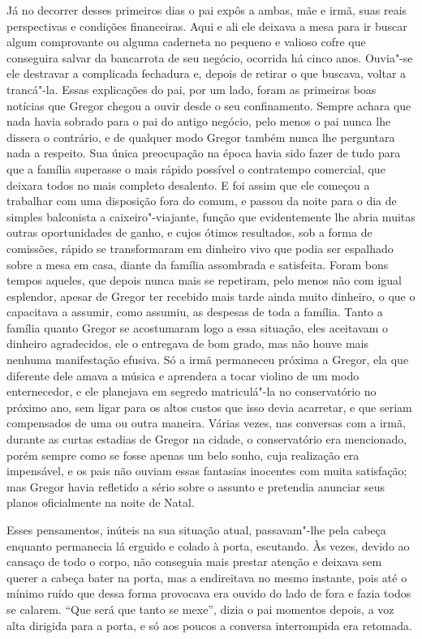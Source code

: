 Já no decorrer desses primeiros dias o pai expôs a ambas, mãe e irmã, suas
reais perspectivas e condições financeiras. Aqui e ali ele deixava a mesa
para ir buscar algum comprovante ou alguma caderneta no pequeno e valioso
cofre que conseguira salvar da bancarrota de seu negócio, ocorrida há
cinco anos. Ouvia"-se ele destravar a complicada fechadura e, depois de
retirar o que buscava, voltar a trancá"-la. Essas explicações do pai, por
um lado, foram as primeiras boas notícias que Gregor chegou a ouvir desde
o seu confinamento. Sempre achara que nada havia sobrado para o pai do
antigo negócio, pelo menos o pai nunca lhe dissera o contrário, e de
qualquer modo Gregor também nunca lhe perguntara nada a respeito. Sua
única preocupação na época havia sido fazer de tudo para que a família
superasse o mais rápido possível o contratempo comercial, que deixara
todos no mais completo desalento. E foi assim que ele começou a trabalhar
com uma disposição fora do comum, e passou da noite para o dia de simples
balconista a caixeiro"-viajante, função que evidentemente lhe abria muitas
outras oportunidades de ganho, e cujos ótimos resultados, sob a forma de
comissões, rápido se transformaram em dinheiro vivo que podia ser
espalhado sobre a mesa em casa, diante da família assombrada e satisfeita.
Foram bons tempos aqueles, que depois nunca mais se repetiram, pelo menos
não com igual esplendor, apesar de Gregor ter recebido mais tarde ainda
muito dinheiro, o que o capacitava a assumir, como assumiu, as despesas de
toda a família. Tanto a família quanto Gregor se acostumaram logo a essa
situação, eles aceitavam o dinheiro agradecidos, ele o entregava de bom
grado, mas não houve mais nenhuma manifestação efusiva. Só a irmã
permaneceu próxima a Gregor, ela que diferente dele amava a música e
aprendera a tocar violino de um modo enternecedor, e ele planejava em
segredo matriculá"-la no conservatório no próximo ano, sem ligar para os
altos custos que isso devia acarretar, e que seriam compensados de uma ou
outra maneira. Várias vezes, nas conversas com a irmã, durante as curtas
estadias de Gregor na cidade, o conservatório era mencionado, porém sempre
como se fosse apenas um belo sonho, cuja realização era impensável, e os
pais não ouviam essas fantasias inocentes com muita satisfação; mas Gregor
havia refletido a sério sobre o assunto e pretendia anunciar seus planos
oficialmente na noite de Natal.

Esses pensamentos, inúteis na sua situação atual, passavam"-lhe pela cabeça
enquanto permanecia lá erguido e colado à porta, escutando. Às vezes,
devido ao cansaço de todo o corpo, não conseguia mais prestar atenção e
deixava sem querer a cabeça bater na porta, mas a endireitava no mesmo
instante, pois até o mínimo ruído que dessa forma provocava era ouvido do
lado de fora e fazia todos se calarem. “Que será que tanto se mexe”, dizia
o pai momentos depois, a voz alta dirigida para a porta, e só aos poucos a
conversa interrompida era retomada.

